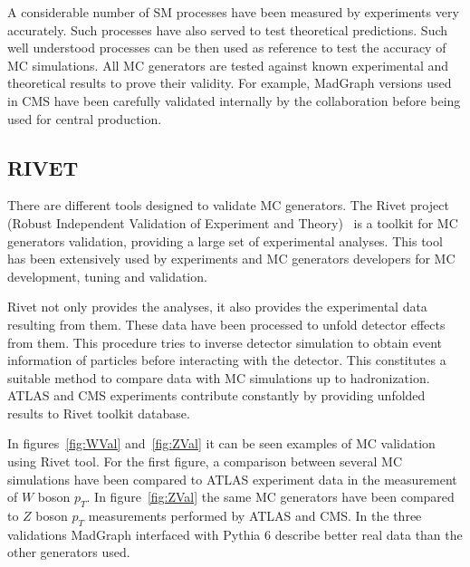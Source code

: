 A considerable number of SM processes have been measured by experiments very accurately. Such processes have also served to test theoretical predictions. Such well understood processes can be then used as reference to test the accuracy of MC simulations. All MC generators are tested against known experimental and theoretical results to prove their validity. For example, MadGraph versions used in CMS have been carefully validated internally by the collaboration before being used for central production.

\subsection{RIVET}
\label{sec:rivet}

There are different tools designed to validate MC generators. The Rivet project (Robust Independent Validation of Experiment and Theory)~\cite{Buckley:2010ar} is a toolkit for MC generators validation, providing a large set of experimental analyses. This tool has been extensively used by experiments and MC generators developers for MC development, tuning and validation. 

Rivet not only provides the analyses, it also provides the experimental data resulting from them. These data have been processed to unfold detector effects from them. This procedure tries to inverse detector simulation to obtain event information of particles before interacting with the detector. This constitutes a suitable method to compare data with MC simulations up to hadronization. ATLAS and CMS experiments contribute constantly by providing unfolded results to Rivet toolkit database.

In figures~\ref{fig:WVal} and~\ref{fig:ZVal} it can be seen examples of MC validation using Rivet tool. For the first figure, a comparison between several MC simulations have been compared to ATLAS experiment data in the measurement of $W$ boson $p_{T}$. In figure~\ref{fig:ZVal} the same MC generators have been compared to $Z$ boson $p_{T}$ measurements performed by ATLAS and CMS. In the three validations MadGraph interfaced with Pythia 6 describe better real data than the other generators used. 

